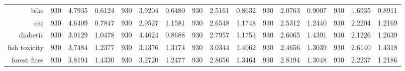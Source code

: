 \begin{table}[H]
{\begin{tabular}{rccccccccccccccc}
			bike                                & 930                                      & 4.7935                                                                    & 0.6124          & 930                            & 3.9204          & 0.6480          & 930                             & 2.5161          & 0.8632          & 930                             & 2.0763                                                                    & 0.9007          & 930                             & \cellcolor[rgb]{ .776,  .937,  .808}\textcolor[rgb]{ 0,  .38,  0}{1.6935}          & 0.8911          \\
			car                                 & 930                                      & 4.6409                                                                    & 0.7847          & 930                            & 2.9527          & 1.1581          & 930                             & 2.6548          & 1.1748          & 930                             & 2.5312                                                                    & 1.2440          & 930                             & \cellcolor[rgb]{ .776,  .937,  .808}\textcolor[rgb]{ 0,  .38,  0}{2.2204}          & 1.2169          \\
			diabetic                            & 930                                      & 3.0129                                                                    & 1.0478          & 930                            & 4.4624          & 0.8688          & 930                             & 2.7957          & 1.1753          & 930                             & 2.6065                                                                    & 1.4391          & 930                             & \cellcolor[rgb]{ .776,  .937,  .808}\textcolor[rgb]{ 0,  .38,  0}{2.1226}          & 1.2639          \\
			fish toxicity                       & 930                                      & 3.7484                                                                    & 1.2377          & 930                            & 3.1376          & 1.3174          & 930                             & 3.0344          & 1.4062          & 930                             & \cellcolor[rgb]{ .776,  .937,  .808}\textcolor[rgb]{ 0,  .38,  0}{2.4656} & 1.3039          & 930                             & 2.6140                                                                             & 1.4318          \\
			forest fires                        & 930                                      & 3.8194                                                                    & 1.4330          & 930                            & 3.2720          & 1.2477          & 930                             & 2.8656          & 1.3464          & 930                             & 2.8194                                                                    & 1.3048          & 930                             & \cellcolor[rgb]{ .776,  .937,  .808}\textcolor[rgb]{ 0,  .38,  0}{2.2237}          & 1.2186          \\

\end{tabular}}
\end{table}
